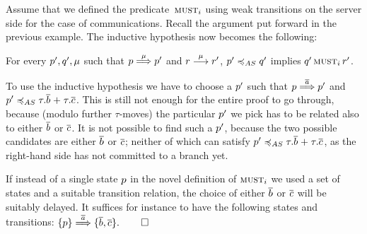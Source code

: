 \begin{example}
  Assume that we defined the predicate~$\operatorname{\textsc{must}}_i$
  using weak transitions on the server side for the case of
  communications. Recall the argument %
  put forward in the previous example.
  The inductive hypothesis now becomes the following:
  \begin{center}
    For every $p', q', \mu$ such that
    $p \mathrel{\overset{\mu} \Longrightarrow} p'$ and $r \mathrel{\overset{\mu}\longrightarrow} r'$,
    $\serverA' \asleq \serverB'$ implies $q' \operatorname{\textsc{must}}_i r'$.
  \end{center}
  To use the inductive hypothesis we have to choose a $p'$ such
  that $p \mathrel{\overset{\overline{a}} \Longrightarrow} p'$ and $\server' \asleq
  \tau.\co{b} \extc \tau.\co{c}$. This is still not enough for the
  entire proof to go through, because (modulo further $\tau$-moves)
  the particular $p'$ we pick has to be related also to either
  $\overline{b}$ or $\overline{c}$. It is not possible to find such a
    $p'$, because
    the two possible candidates
  are either $\overline{b}$
  or $\overline{c}$; neither of which can satisfy $\server' \asleq
  \tau.\co{b} \extc \tau.\co{c}$, as the right-hand side has not
  committed to a branch yet.


  If instead of a single state $p$ in the novel definition of
  $\operatorname{\textsc{must}}_i$ we used a set of %
  states and a suitable
  transition relation, the choice of either $\overline{b}$ or $\overline{c}$ will be
  suitably delayed. It suffices for instance to have the following states and transitions:
  $\{ p \} \mathrel{\overset{\overline{a}} \Longrightarrow} \{ \overline{b}, \overline{c} \}.$\hfill$\qed$
\end{example}

